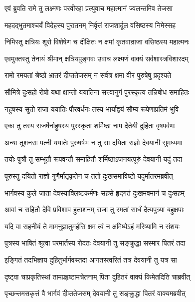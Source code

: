 
\twolineshloka
{एवं ब्रुवति रामे तु लक्ष्मणः परवीरहा}
{प्रत्युवाच महात्मानं ज्वलन्तमिव तेजसा} %

\twolineshloka
{महदद्भुतमाश्चर्यं विदेहस्य पुरातनम्}
{निर्वृत्तं राजशार्दूल वसिष्ठस्य निमेस्सह} %

\twolineshloka
{निमिस्तु क्षत्रियः शूरो विशेषेण च दीक्षितः}
{न क्षमां कृतवान्राजा वसिष्ठस्य महात्मनः} %

\twolineshloka
{एवमुक्तस्तु तेनायं श्रीमान् क्षत्रियपुङ्गवः}
{उवाच लक्ष्मणं वाक्यं सर्वशास्त्रविशारदम्} %

\twolineshloka
{रामो रमयतां श्रेष्ठो भ्रातरं दीप्ततेजसम्}
{न सर्वत्र क्षमा वीर पुरुषेषु प्रदृश्यते} %

\twolineshloka
{सौमित्रे दुःसहो रोषो यथा क्षान्तो ययातिना}
{सत्त्वानुगं पुरस्कृत्य तन्निबोध समाहितः} %

\twolineshloka
{नहुषस्य सुतो राजा ययातिः पौरवर्धनः}
{तस्य भार्याद्वयं सौम्य रूपेणाप्रतिमं भुवि} %

\twolineshloka
{एका तु तस्य राजर्षेर्नाहुषस्य पुरस्कृता}
{शर्मिष्ठा नाम दैतेयी दुहिता वृषपर्वणः} %

\twolineshloka
{अन्या तूशनसः पत्नी ययातेः पुरुषर्षभ}
{न तु सा दयिता राज्ञो देवयानी सुमध्यमा} %

\twolineshloka
{तयोः पुत्रौ तु सम्भूतौ रूपवन्तौ समाहितौ}
{शर्मिष्ठाऽजनयत्पूरुं देवयानी यदुं तदा} %

\twolineshloka
{पूरुस्तु दयितो राज्ञो गुणैर्मातृकृतेन च}
{ततो दुःखसमाविष्टो यदुर्मातरमब्रवीत्} %

\twolineshloka
{भार्गवस्य कुले जाता देवस्याक्लिष्टकर्मणः}
{सहसे हृद्गतं दुःखमवमानं च दुःसहम्} %

\twolineshloka
{आवां च सहितौ देवि प्रविशाव हुताशनम्}
{राजा तु रमतां सार्धं दैत्यपुत्र्या बहुक्षपाः} %

\twolineshloka
{यदि वा सहनीयं ते मामनुज्ञातुमर्हसि}
{क्षम त्वं न क्षमिष्येऽहं मरिष्यामि न संशयः} %

\twolineshloka
{पुत्रस्य भाषितं श्रुत्वा परमार्तस्य रोदतः}
{देवयानी तु सङ्क्रुद्धा सस्मार पितरं तदा} %

\twolineshloka
{इङ्गितं तदभिज्ञाय दुहितुर्भार्गवस्तदा}
{आगतस्त्वरितं तत्र देवयानी तु यत्र सा} %

\twolineshloka
{दृष्ट्वा चाप्रकृतिस्थां तामप्रहृष्टामचेतनाम्}
{पिता दुहितरं वाक्यं किमेतदिति चाब्रवीत्} %

\twolineshloka
{पृच्छन्तमसकृत्तं वै भार्गवं दीप्ततेजसम्}
{देवयानी तु सङ्क्रुद्धा पितरं वाक्यमब्रवीत्} %

